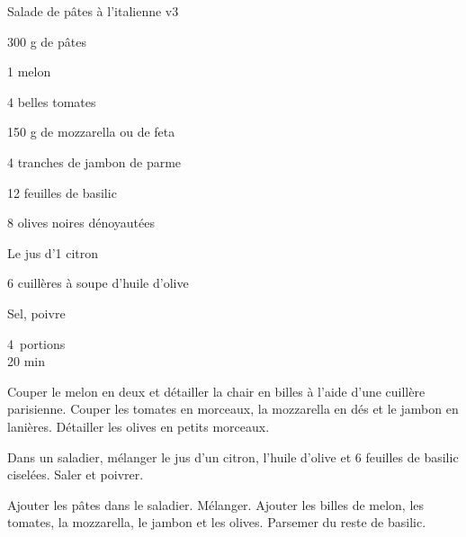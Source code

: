 \begin{recette}{Salade de pâtes à l'italienne v3}

\begin{ingredients}	
 300 g de p\^ates \par
 1 melon\par
 4 belles tomates\par
 150 g de mozzarella ou de feta\par
 4 tranches de jambon de parme\par
 12 feuilles de basilic\par
 8 olives noires d\'enoyaut\'ees\par
 Le jus d'1 citron\par
 6 cuill\`eres \`a soupe d'huile d'olive\par
 Sel, poivre
\end{ingredients}
\begin{infos}
4 portions\\
20 min
\end{infos}

\begin{etapes}
 \item Couper le melon en deux et détailler la chair en billes à l'aide d'une cuillère parisienne. Couper les tomates en morceaux, la mozzarella en dés et le jambon en lanières. Détailler les olives en petits morceaux.
 \item Dans un saladier, mélanger le jus d'un citron, l'huile d'olive et 6 feuilles de basilic ciselées. Saler et poivrer.
 \item Ajouter les pâtes dans le saladier. Mélanger. Ajouter les billes de melon, les tomates, la mozzarella, le jambon et les olives. Parsemer du reste de basilic.
\end{etapes}

\end{recette}	%
